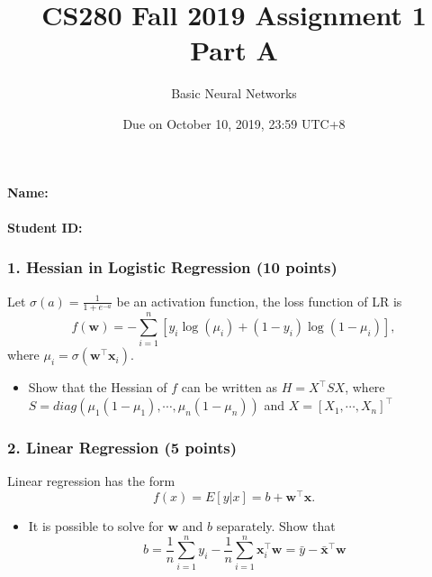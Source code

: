 \documentclass[12pt]{article}%
\begin{document}
\title{CS280 Fall 2019 Assignment 1 \\ Part A}
\author{Basic Neural Networks}
\date{Due on October 10, 2019, 23:59 UTC+8}
\maketitle

\paragraph{Name:}

\paragraph{Student ID:}

\newpage


\subsubsection*{1. Hessian in Logistic Regression (10 points)}
Let $\sigma(a)=\frac{1}{1+e^{-a}}$ be an activation function, the loss function of LR is  \[f(\mathbf{w})=-\sum_{i=1}^{n}[y_i\log(\mu_i)+(1-y_i)\log(1-\mu_i)],\] where $\mu_i=\sigma(\mathbf{w}^\intercal\mathbf{x}_i)$. 
\begin{itemize}
	\item Show that the Hessian of $f$ can be written as $H=X^\intercal S X$, where $S=diag(\mu_1(1-\mu_1),\cdots, \mu_n(1-\mu_n))$ and $X = [X_1,\cdots, X_n]^\intercal$
\end{itemize}


\newpage


\subsubsection*{2. Linear Regression (5 points)}
Linear regression has the form \[f(x)=E[y|x] = b + \mathbf{w}^\intercal \mathbf{x}.\]  
\begin{itemize}
	\item It is possible to solve for $\mathbf{w}$ and $b$ separately. Show that 
	\[b = \frac{1}{n}\sum_{i=1}^n y_i -\frac{1}{n}\sum_{i=1}^n \mathbf{x}_i^\intercal \mathbf{w} = \bar{y} - \bar{\mathbf{x}}^\intercal \mathbf{w}\]
\end{itemize}


\newpage


\end{document}
